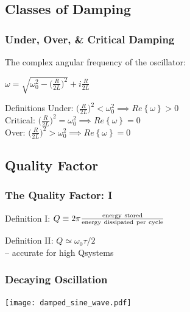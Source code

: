 \documentclass[pdf,hideothersubsections]{beamer}
\begin{document}
\subsection{Classes of Damping}
\begin{frame}
\frametitle{Under, Over, \& Critical Damping}
\pause
The complex angular frequency of the oscillator:

\begin{center}
$\omega = \sqrt{\omega_0^2 - \Big(\frac{R}{2 L}\Big)^2} + i \frac{R}{2 L}$ \\
\end{center}
\pause
\begin{block}{Definitions}
Under: $\Big(\frac{R}{2 L}\Big)^2 < \omega_0^2  \implies
Re\left\{\omega\right\} > 0$ \\
Critical: $\Big(\frac{R}{2 L}\Big)^2 = \omega_0^2 \implies
Re\left\{\omega\right\} = 0$ \\
Over: $\Big(\frac{R}{2 L}\Big)^2 > \omega_0^2 \implies
Re\left\{\omega\right\} = 0$
\end{block}


\end{frame}


\subsection{Quality Factor}
\begin{frame}
\frametitle{The Quality Factor: I}
\pause
\begin{block}{Definition I:}
$Q \equiv 2 \pi \frac{\rm energy~stored}{\rm energy~dissipated~per~cycle}$
\end{block}
\pause
\begin{block}{Definition II:}
$Q \simeq \omega_0 \tau / 2$ \\
-- accurate for high Q\footnotemark systems
\end{block}


\end{frame}

\begin{frame}
\frametitle{Decaying Oscillation}

\centering
\texttt{[image: damped\_sine\_wave.pdf]}

\end{frame}
\end{document}
